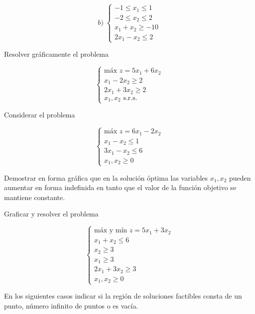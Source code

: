 \begin{Ejer}
\begin{Ejer}
\[
b)\;
\begin{cases}
-1 \le x_1 \le 1 \\
-2 \le x_2 \le 2 \\
x_1 + x_2 \ge -10 \\
2x_1 - x_2 \le 2
\end{cases}
\]

\end{Ejer}

\begin{Ejer}  Resolver gr\'aficamente el problema

\[
\begin{cases}
\text{m\'ax } z = 5x_1 + 6x_2 \\
x_1 - 2x_2 \ge 2 \\
2x_1 + 3x_2 \ge 2 \\
x_1,x_2 \text{ s.r.s.}
\end{cases}
\]

\end{Ejer}

\begin{Ejer}  Considerar el problema

\[
\begin{cases}
\text{m\'ax } z = 6x_1 - 2x_2 \\
x_1 - x_2 \le 1 \\
3x_1 - x_2 \le 6 \\
x_1,x_2 \ge 0
\end{cases}
\]

Demostrar en forma gr\'afica que en la soluci\'on \'optima las variables $x_1,x_2$ pueden aumentar en forma indefinida en tanto que el valor de la funci\'on objetivo se mantiene constante.

\end{Ejer}

\begin{Ejer}  Graficar y resolver el problema

\[
\begin{cases}
\text{m\'ax y m\'in } z = 5x_1 + 3x_2 \\
x_1 + x_2 \le 6 \\
x_2 \ge 3 \\
x_1 \ge 3 \\
2x_1 + 3x_2 \ge 3 \\
x_1,x_2 \ge 0
\end{cases}
\]

En los siguientes casos indicar si la regi\'on de soluciones factibles consta de un punto, n\'umero infinito de puntos o es vac\'ia.


\end{Ejer}
\end{Ejer}

